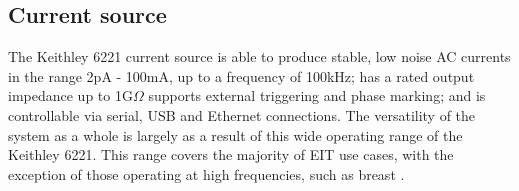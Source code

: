 \subsection{Current source}

The Keithley 6221 current source is able to produce stable, low noise AC currents in the range 2pA - 100mA, up to a frequency of 100kHz; has a rated output impedance up to 1G\(\Omega\) supports external triggering and phase marking; and is controllable via serial, USB and Ethernet connections. The versatility of the system as a whole is largely as a result of this wide operating range of the Keithley 6221. This range covers the majority of EIT use cases, with the exception of those operating at high frequencies, such as breast \cite{Halter}. 